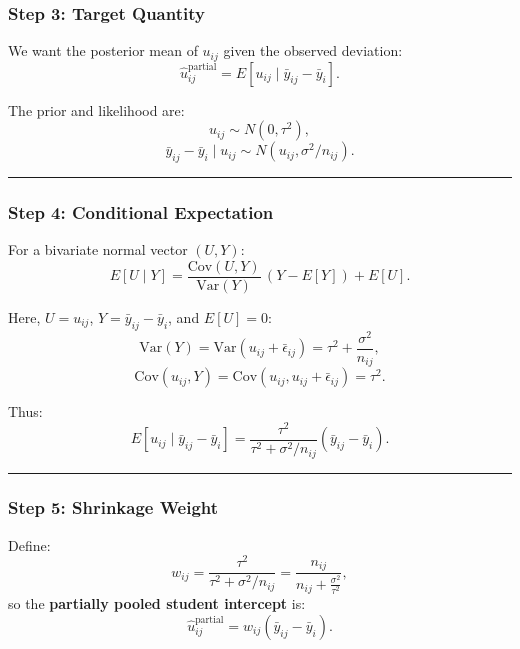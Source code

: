 \documentclass[
  letterpaper,
  DIV=11,
  numbers=noendperiod]{scrreprt}
\begin{document}
\begin{tcolorbox}[enhanced jigsaw, rightrule=.15mm, breakable, left=2mm, colframe=quarto-callout-tip-color-frame, opacityback=0, leftrule=.75mm, toprule=.15mm, colback=white, arc=.35mm, bottomrule=.15mm]
{\subsubsection*{Step 3: Target Quantity}\label{step-3-target-quantity}}

We want the posterior mean of \(u_{ij}\) given the observed deviation:
\[
\hat{u}_{ij}^{\text{partial}} = E[ u_{ij} \mid \bar{y}_{ij} - \bar{y}_i ].
\]

The prior and likelihood are: \[
u_{ij} \sim N(0, \tau^2),
\] \[
\bar{y}_{ij} - \bar{y}_i \mid u_{ij} \sim N(u_{ij}, \sigma^2 / n_{ij}).
\]

\begin{center}\rule{0.5\linewidth}{0.5pt}\end{center}

\hypertarget{step-4-conditional-expectation}{%
\subsubsection*{Step 4: Conditional
Expectation}\label{step-4-conditional-expectation}}

For a bivariate normal vector \((U, Y)\): \[
E[U \mid Y] = \frac{\text{Cov}(U, Y)}{\text{Var}(Y)} \,(Y - E[Y]) + E[U].
\]

Here, \(U = u_{ij}\), \(Y = \bar{y}_{ij} - \bar{y}_i\), and
\(E[U] = 0\): \[
\text{Var}(Y) = \text{Var}(u_{ij} + \bar{\epsilon}_{ij}) = \tau^2 + \frac{\sigma^2}{n_{ij}},
\] \[
\text{Cov}(u_{ij}, Y) = \text{Cov}(u_{ij}, u_{ij} + \bar{\epsilon}_{ij}) = \tau^2.
\]

Thus: \[
E[u_{ij} \mid \bar{y}_{ij} - \bar{y}_i] =
\frac{\tau^2}{\tau^2 + \sigma^2 / n_{ij}} (\bar{y}_{ij} - \bar{y}_i).
\]

\begin{center}\rule{0.5\linewidth}{0.5pt}\end{center}

\hypertarget{step-5-shrinkage-weight}{%
\subsubsection*{Step 5: Shrinkage
Weight}\label{step-5-shrinkage-weight}}

Define: \[
w_{ij} = \frac{\tau^2}{\tau^2 + \sigma^2 / n_{ij}} = \frac{n_{ij}}{n_{ij} + \frac{\sigma^2}{\tau^2}},
\] so the \textbf{partially pooled student intercept} is: \[
\hat{u}_{ij}^{\text{partial}} = w_{ij} (\bar{y}_{ij} - \bar{y}_i).
\]

\end{tcolorbox}
\end{document}
